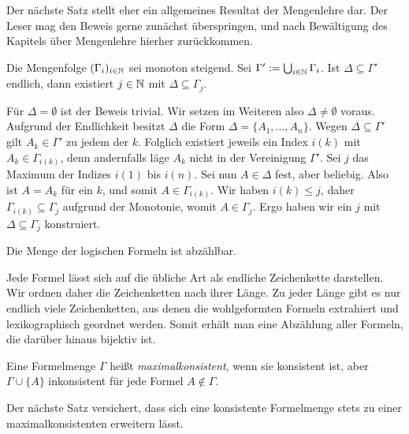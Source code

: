 Der nächste Satz stellt eher ein allgemeines Resultat der Mengenlehre
dar. Der Leser mag den Beweis gerne zunächst überspringen, und
nach Bewältigung des Kapitels über Mengenlehre hierher zurückkommen.

\begin{Satz}\label{endliche-Teilmenge-von-lim-sup}
Die Mengenfolge $(\Gamma_i)_{i\in\mathbb N}$ sei monoton steigend.
Sei $\Gamma':=\bigcup_{i\in\mathbb N}\Gamma_i$. Ist $\Delta\subseteq\Gamma'$
endlich, dann existiert $j\in\mathbb N$ mit $\Delta\subseteq\Gamma_j$.
\end{Satz}
\begin{Beweis}
Für $\Delta=\emptyset$ ist der Beweis trivial. Wir setzen im Weiteren
also $\Delta\ne\emptyset$ voraus. Aufgrund der Endlichkeit
besitzt $\Delta$ die Form $\Delta = \{A_1,\ldots,A_n\}$. Wegen
$\Delta\subseteq\Gamma'$ gilt $A_k\in\Gamma'$ zu jedem der $k$. Folglich
existiert jeweils ein Index $i(k)$ mit $A_k\in\Gamma_{i(k)}$, denn
andernfalls läge $A_k$ nicht in der Vereinigung $\Gamma'$. Sei $j$ das
Maximum der Indizes $i(1)$ bis $i(n)$. Sei nun $A\in\Delta$ fest,
aber beliebig. Also ist $A=A_k$ für ein $k$, und somit
$A\in\Gamma_{i(k)}$. Wir haben $i(k)\le j$, daher $\Gamma_{i(k)}\subseteq\Gamma_j$
aufgrund der Monotonie, womit $A\in\Gamma_j$. Ergo haben wir ein $j$
mit $\Delta\subseteq\Gamma_j$ konstruiert.\,\qedsymbol
\end{Beweis}

\begin{Satz}\label{Formeln-abzaehlbar}
Die Menge der logischen Formeln ist abzählbar.
\end{Satz}
\begin{Beweis}
Jede Formel lässt sich auf die übliche Art als endliche Zeichenkette
darstellen. Wir ordnen daher die Zeichenketten nach ihrer Länge. Zu
jeder Länge gibt es nur endlich viele Zeichenketten, aus denen die
wohlgeformten Formeln extrahiert und lexikographisch geordnet werden.
Somit erhält man eine Abzählung aller Formeln, die darüber hinaus
bijektiv ist.\,\qedsymbol
\end{Beweis}

\begin{Definition}
Eine Formelmenge $\Gamma$ heißt \emph{maximalkonsistent}, wenn sie
konsistent ist, aber $\Gamma\cup\{A\}$ inkonsistent für jede Formel
$A\notin\Gamma$.
\end{Definition}

\noindent
Der nächste Satz versichert, dass sich eine konsistente Formelmenge
stets zu einer maximalkonsistenten erweitern lässt.

